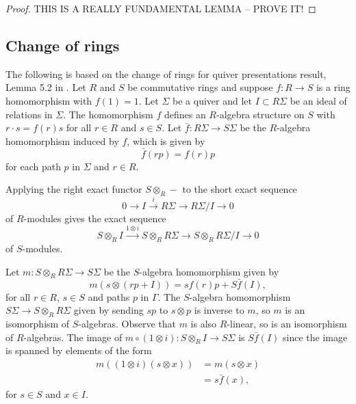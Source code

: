 \documentclass[a4paper, 11pt]{report}
\begin{document}
\begin{proof}
{\color{red}THIS IS A REALLY FUNDAMENTAL LEMMA -- PROVE IT!}
\end{proof}


\subsection{Change of rings}

The following is based on the change of rings for quiver presentations result, Lemma 5.2 in \cite{su12}. Let $R$ and $S$ be commutative rings and suppose $f\colon R\to S$ is a ring homomorphism with $f(1)=1$. Let $\Sigma$ be a quiver and let $I\subset R\Sigma$ be an ideal of relations in $\Sigma$. The homomorphism $f$ defines an $R$-algebra structure on $S$ with $r\cdot s = f(r)s$ for all $r\in R$ and $s\in S$. Let $\bar{f}\colon R\Sigma\to S\Sigma$ be the $R$-algebra homomorphism induced by $f$, which is given by
\begin{equation*}
\bar{f}(rp)=f(r)p
\end{equation*}
for each path $p$ in $\Sigma$ and $r\in R$.

Applying the right exact functor $S\otimes_R -$ to the short exact sequence
\begin{equation*}
0\to I \overset{i}\to R\Sigma \to R\Sigma/{I} \to 0
\end{equation*}
of $R$-modules gives the exact sequence
\begin{equation*}
S\otimes_R I \overset{1\otimes i}\to S\otimes_R R\Sigma \to S\otimes_R R\Sigma/{I} \to 0
\end{equation*}
of $S$-modules.

Let $m\colon S\otimes_R R\Sigma\to S\Sigma$ be the $S$-algebra homomorphism given by
\begin{equation*}
m(s\otimes (rp+I)) = sf(r)p + S\bar{f}{(I)},
\end{equation*}
for all $r\in R$, $s\in S$ and paths $p$ in $\Gamma$. The $S$-algebra homomorphism $S\Sigma\to S\otimes_R R\Sigma$ given by sending $sp$ to $s\otimes p$ is inverse to $m$, so $m$ is an isomorphism of $S$-algebras. Observe that $m$ is also $R$-linear, so is an isomorphism of $R$-algebras. The image of $m\circ (1\otimes i)\colon S\otimes_R I \to S\Sigma$ is $S\bar{f}{(I)}$ since the image is spanned by elements of the form
\begin{align*}
m((1\otimes i)(s\otimes x))
&= m(s\otimes x)\\
&= s\bar{f}{(x)},
\end{align*}
for $s\in S$ and $x\in I$.
\end{document}

